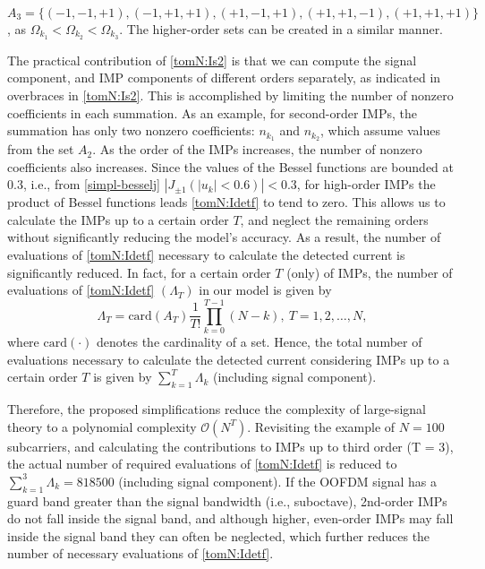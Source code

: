 \documentclass[journal]{IEEEtran}
\begin{document}
$A_3 = \{(-1, -1, +1), (-1, +1, +1), (+1, -1, +1), (+1, +1, -1),\allowbreak (+1, +1, +1)\}$, as $\Omega_{k_1} < \Omega_{k_2} < \Omega_{k_3}$. The higher-order sets can be created in a similar manner.

The practical contribution of \eqref{tomN:Is2} is that we can compute the signal component, and IMP components of different orders separately, as indicated in overbraces in \eqref{tomN:Is2}. This is accomplished by limiting the number of nonzero coefficients in each summation. As an example, for second-order IMPs, the summation has only two nonzero coefficients: $n_{k_1}$ and $n_{k_2}$, which assume values from the set $A_2$. As the order of the IMPs increases, the number of nonzero coefficients also increases. Since the values of the Bessel functions are bounded at 0.3, i.e., from \eqref{simpl-besselj} $|J_{\pm 1}(|u_k| < 0.6)| < 0.3$, for high-order IMPs the product of Bessel functions leads \eqref{tomN:Idetf} to tend to zero. This allows us to calculate the IMPs up to a certain order $T$, and neglect the remaining orders without significantly reducing the model's accuracy. As a result, the number of evaluations of \eqref{tomN:Idetf} necessary to calculate the detected current is significantly reduced. In fact, for a certain order $T$ (only) of IMPs, the number of evaluations of \eqref{tomN:Idetf} $(\Lambda_T)$ in our model is given by
\setcounter{equation}{6}
\begin{equation}\label{its}
\Lambda_T = \mathrm{card}(A_T)\frac{1}{T!}\prod_{k = 0}^{T-1} (N - k),~T = 1,2,\ldots,N,
\end{equation}
where $\mathrm{card}(\cdot)$ denotes the cardinality of a set. Hence, the total number of evaluations necessary to calculate the detected current considering IMPs up to a certain order $T$ is given by $\sum_{k = 1}^T \Lambda_k$ (including signal component).

Therefore, the proposed simplifications reduce the complexity of large-signal theory to a polynomial complexity $\mathcal{O}(N^{T})$. Revisiting the example of $N = 100$ subcarriers, and calculating the contributions to IMPs up to third order (T = 3), the actual number of required evaluations of \eqref{tomN:Idetf} is reduced to $\sum_{k = 1}^3 \Lambda_k = 818500$ (including signal component). If the OOFDM signal has a guard band greater than the signal bandwidth (i.e., suboctave), 2nd-order IMPs do not fall inside the signal band, and although higher, even-order IMPs may fall inside the signal band they can often be neglected, which further reduces the number of necessary evaluations of \eqref{tomN:Idetf}.
\end{document}
